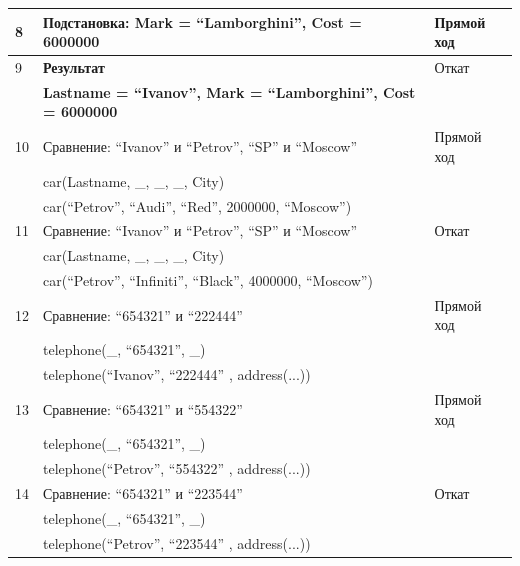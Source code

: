 {\begin{longtable}{|p{1.15cm}|p{8cm}|p{8cm}|}
    8 & Подстановка: Mark = ``Lamborghini'', Cost = 6000000 & Прямой ход \\
    \hline
    9 & \textbf{Результат} & Откат \\
      & \textbf{Lastname = ``Ivanov'', Mark = ``Lamborghini'', Cost = 6000000} & \\
    \hline
    10 & Сравнение: ``Ivanov'' и ``Petrov'', ``SP'' и ``Moscow'' & Прямой ход \\
      & car(Lastname, \_, \_, \_, City) & \\
      & car(``Petrov'', ``Audi'', ``Red'', 2000000, ``Moscow'') & \\
    \hline
    11 & Сравнение: ``Ivanov'' и ``Petrov'', ``SP'' и ``Moscow'' & Откат \\
      & car(Lastname, \_, \_, \_, City) & \\
      & car(``Petrov'', ``Infiniti'', ``Black'', 4000000, ``Moscow'') & \\
    \hline
    12 & Сравнение:  ``654321'' и ``222444'' & Прямой ход \\
      & telephone(\_, ``654321'', \_) & \\
      & telephone(``Ivanov'', ``222444'' , address(...)) & \\
    \hline
    13 & Сравнение:  ``654321'' и ``554322'' & Прямой ход \\
      & telephone(\_, ``654321'', \_) & \\
      & telephone(``Petrov'', ``554322'' , address(...)) & \\
    \hline
    14 & Сравнение:  ``654321'' и ``223544'' & Откат \\
      & telephone(\_, ``654321'', \_) & \\
      & telephone(``Petrov'', ``223544'' , address(...)) & \\
    \hline
\end{longtable}
}

